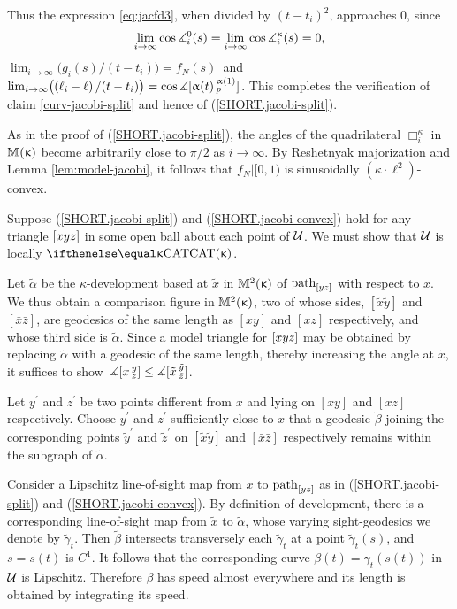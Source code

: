 Thus the expression \ref{eq:jacfd3}, when divided by $(t-t_i)^2$, approaches $0$, since  
\[
 \lim_{i\to\infty} \cos\mangle_i^0(s)=\lim_{i\to\infty} \cos\mangle_i^\kappa(s)=0,
\] 
$\lim_{i\to \infty}\bigl( g_i(s)/(t-t_i)\bigr)=f_N(s)\,$ and \,$\lim_{i\to \infty}\bigl((\ell_i - \ell)\,/(t-t_i)\bigr)=\cos\mangle\hinge {\alpha(t)} {\alpha(1)} {p}$.  This completes the verification of
claim \ref{curv-jacobi-split} and hence of (\ref{SHORT.jacobi-split}).

As in the proof of (\ref{SHORT.jacobi-split}), the angles of the 
quadrilateral ${\Box}_i^\kappa$ in $\mathbb{M}_{{}}^{}({\upkappa})$ become arbitrarily close to $\pi/2$ as $i\to\infty$.   
By Reshetnyak majorization and Lemma \ref{lem:model-jacobi}, it follows that
$f_N|[0,1)$ is sinusoidally $(\kappa\cdot\ell^2)$-convex.  
\qeds

Suppose
 (\ref{SHORT.jacobi-split}) and (\ref{SHORT.jacobi-convex}) hold for any triangle $[{x}{y}{z}]$ in some open ball about each point of $\mathcal{U}$.
We must show that $\mathcal{U}$ is locally $\CAT\kappa$.

Let  $\tilde \alpha$ be  the $\kappa$-development based at $\tilde x$ in $\mathbb{M}_{{}}^{2}({\upkappa})$ of $\mathrm{path}_{[yz]}$ with respect to $x$.  We thus obtain a comparison figure in $\mathbb{M}_{{}}^{2}({\upkappa})$, two of whose sides, $[\tilde x\tilde y]$ and $[\bar x \bar z]$, are geodesics of the same length as $[xy]$ and $[xz]$ respectively, and whose third side is $\tilde \alpha$. Since a model triangle for $[{x}{y}{z}]$  may be obtained by replacing  $\tilde \alpha$ with a geodesic of the same length, thereby increasing the angle at $\tilde x$,  it suffices to show \,$\mangle\hinge {x}{y}
{z}\le\mangle\hinge {\tilde x}{\tilde y}{\tilde z}$.

Let $y^\prime$ and $z^\prime$ be two points  different from $x$ and lying on $[xy]$  and $[ x z]$  respectively.  Choose $y^\prime$ and $z^\prime$  sufficiently close to $x$ that a geodesic $\tilde \beta$ joining the corresponding points $\tilde  y^\prime$ and $\tilde  z^\prime$ on $[\tilde x\tilde y]$ and $[\bar x \bar z]$  respectively remains within the subgraph of $\tilde \alpha$. 

Consider a Lipschitz line-of-sight map from $x$ to $\mathrm{path}_{[yz]}$ as in (\ref{SHORT.jacobi-split}) and  (\ref{SHORT.jacobi-convex}). By  definition of development, there is a corresponding line-of-sight map from $\tilde x$ to $\tilde \alpha$, whose varying sight-geodesics we denote by $\tilde \gamma_t$.    Then $\tilde \beta$  intersects transversely each $\tilde \gamma_t$ at a point $\tilde \gamma_t(s)$, and $s=s(t)$ is $C^1$. It follows that the corresponding curve  $\beta(t)=\gamma_t(s(t))$   in $\mathcal{U}$ is Lipschitz. Therefore $\beta$ has speed almost everywhere  and its length is obtained by integrating its speed. 

